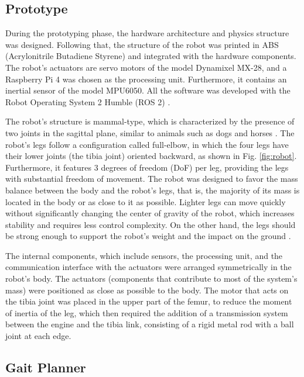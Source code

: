 \documentclass[conference]{IEEEtran}
\begin{document}
\subsection{Prototype}

During the prototyping phase, the hardware architecture and physics structure was designed. Following that, the structure of the robot was printed in ABS (Acrylonitrile Butadiene Styrene) and integrated with the hardware components. The robot's actuators are servo motors of the model Dynamixel MX-28, and a Raspberry Pi 4 was chosen as the processing unit. Furthermore, it contains an inertial sensor of the model MPU6050. All the software was developed with the Robot Operating System 2 Humble (ROS 2) \cite{ROS2Humble}.

The robot's structure is mammal-type, which is characterized by the presence of two joints in the sagittal plane, similar to animals such as dogs and horses \cite{Kitano2016}.  The robot's legs follow a configuration called full-elbow, in which the four legs have their lower joints (the tibia joint) oriented backward, as shown in Fig. \ref{fig:robot}. Furthermore, it features 3 degrees of freedom (DoF) per leg, providing the legs with substantial freedom of movement. The robot was designed to favor the mass balance between the body and the robot's legs, that is, the majority of its mass is located in the body or as close to it as possible. Lighter legs can move quickly without significantly changing the center of gravity of the robot, which increases stability and requires less control complexity.  On the other hand, the legs should be strong enough to support the robot's weight and the impact on the ground \cite{Zhong2019}.

The internal components, which include sensors, the processing unit, and the communication interface with the actuators were arranged symmetrically in the robot's body. The actuators (components that contribute to most of the system's mass) were positioned as close as possible to the body. The motor that acts on the tibia joint was placed in the upper part of the femur, to reduce the moment of inertia of the leg, which then required the addition of a transmission system between the engine and the tibia link, consisting of a rigid metal rod with a ball joint at each edge.

\subsection{Gait Planner}
\end{document}
